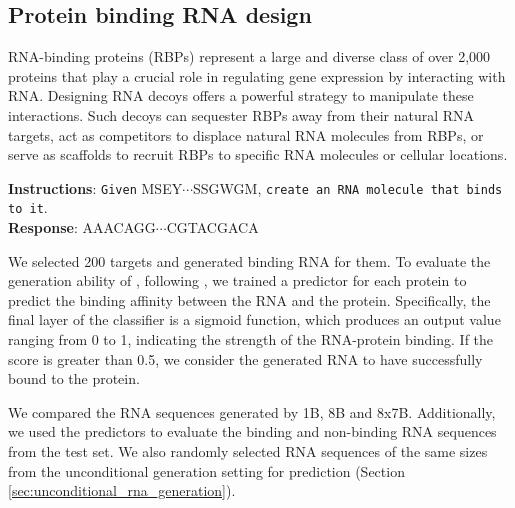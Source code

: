 
\subsection{Protein binding RNA design}\label{sec:protein2rna}
RNA-binding proteins (RBPs) represent a large and diverse class of over 2,000 proteins that play a crucial role in regulating gene expression by interacting with RNA. Designing RNA decoys offers a powerful strategy to manipulate these interactions. Such decoys can sequester RBPs away from their natural RNA targets, act as competitors to displace natural RNA molecules from RBPs, or serve as scaffolds to recruit RBPs to specific RNA molecules or cellular locations.


\begin{example}
\noindent\textbf{Instructions}:  \texttt{Given} \pro{}MSEY$\cdots$SSGWGM\epro{}, \texttt{create an RNA molecule that binds to it}.	\\
\noindent\textbf{Response}:
\rna{}AAACAGG$\cdots$CGTACGACA\erna{}
\end{example}

We selected 200 targets and generated binding RNA for them. To evaluate the generation ability of \ourM{}, following \cite{xu2023prismnet}, we trained a predictor for each protein to predict the binding affinity between the RNA and the protein. Specifically, the final layer of the classifier is a sigmoid function, which produces an output value ranging from 0 to 1, indicating the strength of the RNA-protein binding. If the score is greater than 0.5, we consider the generated RNA to have successfully bound to the protein.

We compared the RNA sequences generated by \ourM{} 1B, 8B and 8x7B. Additionally, we used the predictors to evaluate the binding and non-binding RNA sequences from the test set. We also randomly selected RNA sequences of the same sizes from the unconditional generation setting for prediction (Section \ref{sec:unconditional_rna_generation}). %

